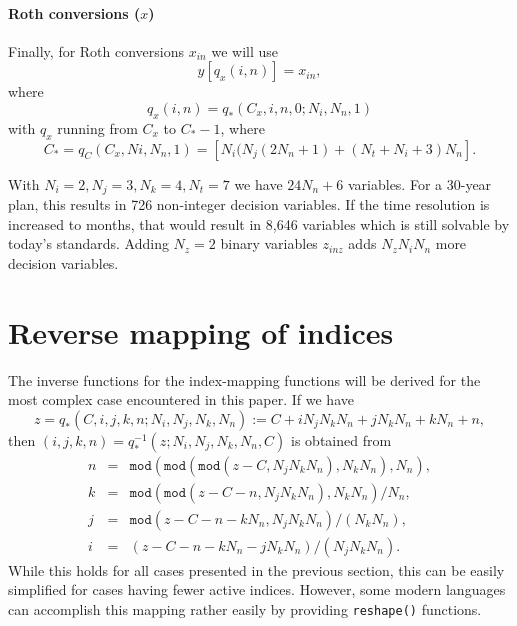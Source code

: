 \documentclass{report}[fleqn,11pt]
\begin{document}
\paragraph*{Roth conversions (\boldmath$x$)}
Finally, for Roth conversions $x_{in}$ we will use
\begin{equation}
	y[q_x(i, n)] = x_{i n},
\end{equation}
where
\begin{equation}
	q_x(i, n) = q_*(C_x, i, n, 0; N_i, N_n, 1)
\end{equation}
with $q_x$ running from $C_x$ to $C_* - 1$, where
\[
	C_* = q_C(C_x, Ni, N_n, 1) = [N_i(N_j(2N_n + 1) + (N_t + N_i + 3) N_n].
\]

With $N_i = 2, N_j = 3, N_k = 4, N_t = 7$ we have $24 N_n + 6$ variables. For
a 30-year plan, this results in 726 non-integer decision variables.
If the time resolution is increased to
months, that would result in 8,646 variables which is still solvable by today's standards.
Adding $N_z=2$ binary variables $z_{inz}$ adds $N_zN_iN_n$ more decision variables.

\section{Reverse mapping of indices}
The inverse functions for the index-mapping functions will be derived for the
most complex case encountered in this paper.
If we have
\begin{equation}
	z = q_*(C, i, j, k, n; N_i, N_j, N_k, N_n) := C + iN_jN_kN_n + jN_kN_n + kN_n + n,
\end{equation}
then $(i, j, k, n) = q_*^{-1}(z; N_i, N_j, N_k, N_n, C)$ is obtained from
\begin{eqnarray}
	n &=& \texttt{mod}(\texttt{mod}(\texttt{mod}(z - C, N_jN_kN_n), N_kN_n), N_n), \nonumber \\
	k &=& \texttt{mod}(\texttt{mod}(z - C - n, N_jN_kN_n), N_kN_n)/N_n, \nonumber \\
	j &=& \texttt{mod}(z - C - n - kN_n, N_jN_kN_n)/(N_kN_n), \nonumber \\
	i &=& (z - C - n - kN_n - jN_kN_n)/(N_jN_kN_n).
\end{eqnarray}
While this holds for all cases presented in the previous section, this can be easily simplified
for cases having fewer active indices. However, some modern languages can accomplish this
mapping rather easily by providing \texttt{reshape()} functions.
\end{document}
